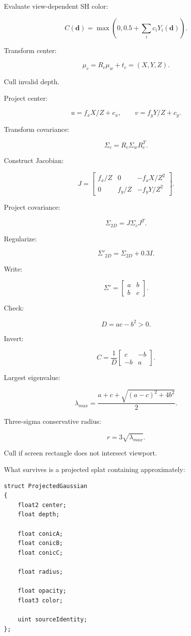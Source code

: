 Evaluate view-dependent SH color:

\[
\boxed{
C(\mathbf d)
=
\max
\left(
0,
0.5+
\sum_i
c_iY_i(\mathbf d)
\right).
}
\]

Transform center:

\[
\boxed{
\mu_c=
R_c\mu_w+t_c
=
(X,Y,Z).
}
\]

Cull invalid depth.

Project center:

\[
\boxed{
u=
f_xX/Z+c_x,
\qquad
v=
f_yY/Z+c_y.
}
\]

Transform covariance:

\[
\boxed{
\Sigma_c=
R_c\Sigma_wR_c^T.
}
\]

Construct Jacobian:

\[
\boxed{
J=
\begin{bmatrix}
f_x/Z&0&-f_xX/Z^2\\
0&f_y/Z&-f_yY/Z^2
\end{bmatrix}.
}
\]

Project covariance:

\[
\boxed{
\Sigma_{2D}
=
J\Sigma_cJ^T.
}
\]

Regularize:

\[
\boxed{
\Sigma'_{2D}
=
\Sigma_{2D}
+
0.3I.
}
\]

Write:

\[
\Sigma'=
\begin{bmatrix}
a&b\\
b&c
\end{bmatrix}.
\]

Check:

\[
\boxed{
D=ac-b^2>0.
}
\]

Invert:

\[
\boxed{
C=
\frac1D
\begin{bmatrix}
c&-b\\
-b&a
\end{bmatrix}.
}
\]

Largest eigenvalue:

\[
\boxed{
\lambda_{max}
=
\frac{
a+c+
\sqrt{(a-c)^2+4b^2}
}{
2
}.
}
\]

Three-sigma conservative radius:

\[
\boxed{
r=
3\sqrt{\lambda_{max}}.
}
\]

Cull if screen rectangle does not intersect viewport.

What survives is a projected splat containing approximately:

\protect{}\label{d8pb5g}%
\begin{verbatim}
struct ProjectedGaussian
{
    float2 center;
    float depth;

    float conicA;
    float conicB;
    float conicC;

    float radius;

    float opacity;
    float3 color;

    uint sourceIdentity;
};
\end{verbatim}

